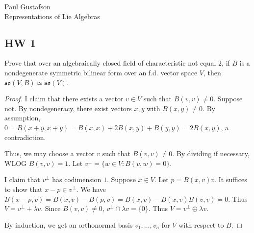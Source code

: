 \documentclass{article}
\begin{document}
\noindent Paul Gustafson\\
\noindent Representations of Lie Algebras

\subsection*{HW 1}
 Prove that over an algebraically closed field of characteristic not equal 2, if $B$ is a nondegenerate symmetric bilinear form over an f.d. vector space $V$, then $\mathfrak{so}(V,B) \simeq \mathfrak{so}(V)$.
\begin{proof}
I claim that there exists a vector $v \in V$ such that $B(v,v) \neq 0$.  Suppose not.  By nondegeneracy, there exist vectors $x,y$ with $B(x,y) \neq 0$.  By assumption, $0 = B(x+y, x+y) = B(x,x) + 2B(x,y) + B(y,y) = 2B(x,y)$, a contradiction.

Thus, we may choose a vector $v$ such that $B(v,v) \neq 0$. By dividing if necessary, WLOG $B(v,v) = 1$.  Let $v^\perp = \{w \in V : B(v,w) = 0\}$.  

I claim that $v^\perp$ has codimension $1$.  Suppose $x \in V$.  Let $p = B(x,v) v$.   It suffices to show that $x - p \in v^\perp$.  We have $B(x-p, v) = B(x,v) - B(p,v) = B(x,v) - B(x,v) B(v,v) = 0$.  Thus $V = v^\perp + \lambda v$.  Since $B(v,v) \neq 0$, $v^\perp \cap \lambda v = \{0\}$.  Thus $V = v^\perp \oplus \lambda v$.

By induction, we get an orthonormal basis $v_1, \ldots, v_n$ for $V$ with respect to $B$.
\end{proof}
\end{document}
